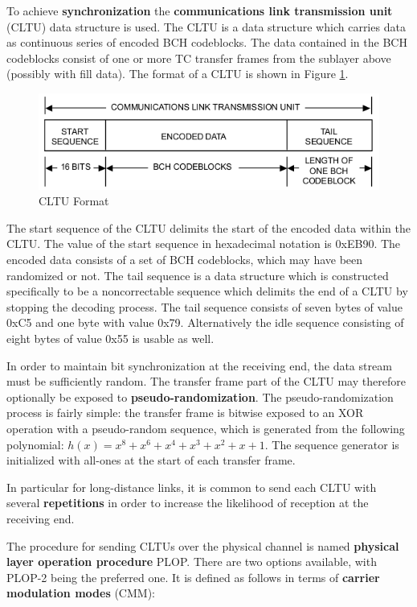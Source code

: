 To achieve \textbf{synchronization} the \textbf{communications link transmission unit} (CLTU) data structure is used. The CLTU is a data structure which carries data as continuous series of encoded BCH codeblocks. The data contained in the BCH codeblocks consist of one or more TC transfer frames from the sublayer above (possibly with fill data). The format of a CLTU is shown in Figure \ref{fig:CLTU Format}. 

\begin{figure}[h]
\centering\includegraphics[scale=0.6]{fig/cltu_format}
\caption{CLTU Format}
\label{fig:CLTU Format}
\end{figure}

The start sequence of the CLTU delimits the start of the encoded data within the CLTU. The value of the start sequence in hexadecimal notation is 0xEB90. The encoded data consists of a set of BCH codeblocks, which may have been randomized or not. The tail sequence is a data structure which is constructed specifically to be a noncorrectable sequence which delimits the end of a CLTU by stopping the decoding process. The tail sequence consists of seven bytes of value 0xC5 and one byte with value 0x79. Alternatively the idle sequence consisting of eight bytes of value 0x55 is usable as well.

In order to maintain bit synchronization at the receiving end, the data stream must be sufficiently random. The transfer frame part of the CLTU may therefore optionally be exposed to \textbf{pseudo-randomization}. The pseudo-randomization process is fairly simple: the transfer frame is bitwise exposed to an XOR operation with a pseudo-random sequence, which is generated from the following polynomial: $h(x) = x^{8} + x^{6} +x^{4} + x^{3} + x^{2} + x + 1$. The sequence generator is initialized with all-ones at the start of each transfer frame.

In particular for long-distance links, it is common to send each CLTU with several \textbf{repetitions} in order to increase the likelihood of reception at the receiving end.

The procedure for sending CLTUs over the physical channel is named \textbf{physical layer operation procedure} PLOP. There are two options available, with PLOP-2 being the preferred one. It is defined as follows in terms of \textbf{carrier modulation modes} (CMM):

